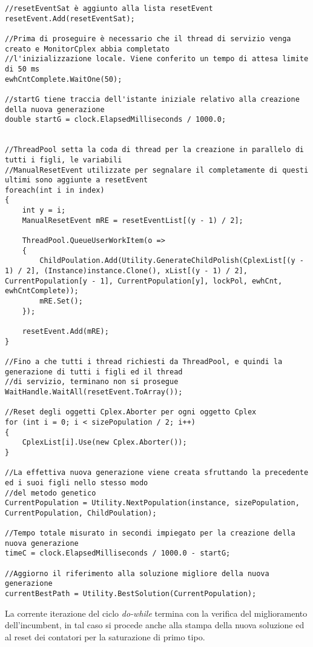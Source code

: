 \documentclass[11pt]{article}
\begin{document}
\begin{lstlisting}
//resetEventSat è aggiunto alla lista resetEvent
resetEvent.Add(resetEventSat);

//Prima di proseguire è necessario che il thread di servizio venga creato e MonitorCplex abbia completato 
//l'inizializzazione locale. Viene conferito un tempo di attesa limite di 50 ms
ewhCntComplete.WaitOne(50);

//startG tiene traccia dell'istante iniziale relativo alla creazione della nuova generazione
double startG = clock.ElapsedMilliseconds / 1000.0;


//ThreadPool setta la coda di thread per la creazione in parallelo di tutti i figli, le variabili
//ManualResetEvent utilizzate per segnalare il completamente di questi ultimi sono aggiunte a resetEvent
foreach(int i in index)
{
    int y = i;
    ManualResetEvent mRE = resetEventList[(y - 1) / 2];

    ThreadPool.QueueUserWorkItem(o =>
    {
        ChildPoulation.Add(Utility.GenerateChildPolish(CplexList[(y - 1) / 2], (Instance)instance.Clone(), xList[(y - 1) / 2], CurrentPopulation[y - 1], CurrentPopulation[y], lockPol, ewhCnt, ewhCntComplete));
        mRE.Set();
    });

    resetEvent.Add(mRE);
}

//Fino a che tutti i thread richiesti da ThreadPool, e quindi la generazione di tutti i figli ed il thread
//di servizio, terminano non si prosegue
WaitHandle.WaitAll(resetEvent.ToArray());

//Reset degli oggetti Cplex.Aborter per ogni oggetto Cplex
for (int i = 0; i < sizePopulation / 2; i++)
{
    CplexList[i].Use(new Cplex.Aborter());
}

//La effettiva nuova generazione viene creata sfruttando la precedente ed i suoi figli nello stesso modo
//del metodo genetico
CurrentPopulation = Utility.NextPopulation(instance, sizePopulation, CurrentPopulation, ChildPoulation);

//Tempo totale misurato in secondi impiegato per la creazione della nuova generazione
timeC = clock.ElapsedMilliseconds / 1000.0 - startG;

//Aggiorno il riferimento alla soluzione migliore della nuova generazione
currentBestPath = Utility.BestSolution(CurrentPopulation);
\end{lstlisting}

La corrente iterazione del ciclo \textit{do-while} termina con la verifica del miglioramento dell'incumbent, in tal caso si procede anche alla stampa della nuova soluzione ed al reset dei contatori per la saturazione di primo tipo.
\end{document}
